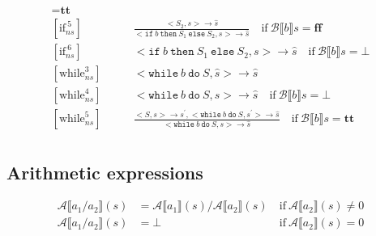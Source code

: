 \documentclass[11pt,oneside,a4paper]{article}
\begin{document}
\begin{align*}
= \textbf{tt}\\
[\text{if}_{ns}^{\:5}] \quad \quad & \frac{<S_2, s> \rightarrow \hat{s}}
{ <\texttt{if}\:b\: \texttt{then}\:  S_1 \: \texttt{else} \: S_2, s> 
\rightarrow \hat{s}} \quad \text{if} \: \mathcal{B} \llbracket b \rrbracket s
= \textbf{ff}\\
[\text{if}_{ns}^{\:6}] \quad \quad & <\texttt{if}\:b\: \texttt{then}\:  S_1 \: 
\texttt{else} \: S_2, s> \rightarrow \hat{s} \quad 
\text{if} \: \mathcal{B} \llbracket b \rrbracket s
= \bot \\
[\text{while}_{ns}^3] \quad \quad & <\texttt{while}\: b \:\texttt{do}\: S, 
\hat{s}> \rightarrow \hat{s} \\
[\text{while}_{ns}^4] \quad \quad & 
<\texttt{while}\: b \:\texttt{do}\: S, s> \rightarrow \hat{s} 
\quad \text{if} \: \mathcal{B} \llbracket b \rrbracket s = \bot \\
[\text{while}_{ns}^5] \quad \quad & 
\frac{<S,s> \rightarrow s^{'}, <\texttt{while}\: b \: \texttt{do} \: S, s^{'}>
\rightarrow \hat{s}}
{<\texttt{while}\: b \: \texttt{do}\: S, s> \rightarrow \hat{s}} 
\quad \text{if} \: \mathcal{B} \llbracket b \rrbracket s = \textbf{tt} \\
\end{align*}
\endgroup

\subsection*{Arithmetic expressions}
\begin{align*}
\mathcal{A}\llbracket a_1 / a_2 \rrbracket(s) &= \mathcal{A}\llbracket a_1
\rrbracket(s) / \mathcal{A}\llbracket a_2 \rrbracket(s)\:& \text{if} \:
\mathcal{A}\llbracket a_2 \rrbracket(s) \neq 0 \\
\mathcal{A}\llbracket a_1 / a_2 \rrbracket(s) &= \bot\:& \text{if} \:
\mathcal{A}\llbracket a_2 \rrbracket(s) = 0 \\
\end{align*}
\end{document}
